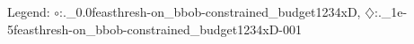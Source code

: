Legend: {\color{NavyBlue}$\circ$}:.\cobyla\_0.0feasthresh-on\_bbob-constrained\_budget1234xD, {\color{Magenta}$\diamondsuit$}:.\cobyla\_1e-5feasthresh-on\_bbob-constrained\_budget1234xD-001